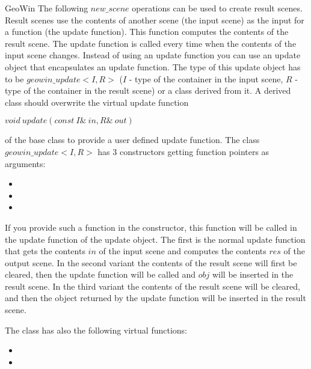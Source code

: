 \begin{ccRefClass}{GeoWin}
\medskip
The following $new\_scene$ operations can be used to create result scenes.
Result scenes use the contents of another scene (the input scene) 
as the input for a function (the update function). 
This function computes the contents of the result scene. The update function 
is called every time when the contents of the input scene changes.
Instead of using an update function you can use an update object that encapsulates
an update function.
The type of this update object has to be $geowin\_update<I,R>$ 
($I$ - type of the container in the input scene,
$R$ - type of the container in the result scene) or a class derived from it.
A derived class should overwrite the virtual update function

     $void \ update(const \ I\& \ in,R\& \ out)$ 
     
of the base class to provide a user defined update function. 
The class $geowin\_update<I,R>$ has 3 constructors getting function pointers
as arguments:
    \begin{itemize}    
     \item {}
     
     \item {}
     
     \item {}
    \end{itemize}
    
If you provide such a function in the constructor, this function will
be called in the update function of the update object.
The first is the normal update function that gets the contents $in$ of the input 
scene and computes the contents $res$ of the output scene. 
In the second variant the contents of the result scene will first be cleared, then the
update function will be called and $obj$ will be inserted in the result scene.
In the third variant the contents of the result scene will be cleared, and then
the object returned by the update function will be inserted in the result scene.

The class  has also the following virtual functions:
\begin{itemize}    
     \item {}
 
     \item {}
 

\end{itemize}
\end{ccRefClass}
